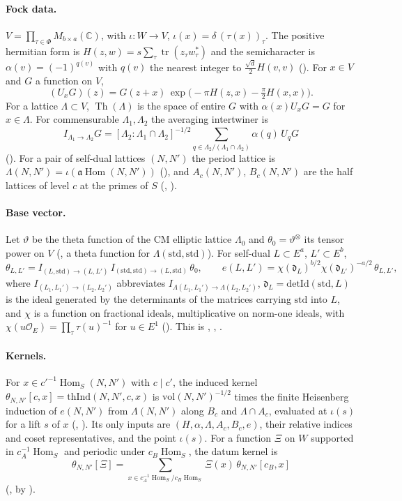 \documentclass[11pt]{article}
\newcommand{\tr}{\operatorname{tr}}
\newcommand{\Hom}{\operatorname{Hom}}
\newcommand{\Th}{\operatorname{Th}}
\newcommand{\OEr}{\mathcal O_E}
\theoremstyle{definition}
\theoremstyle{remark}
\begin{document}
\paragraph{Fock data.} $V=\prod_{\tau\in\Phi}M_{b\times a}(\mathbb C)$, with $\iota\colon W\to V$, $\iota(x)=\delta\,(\tau(x))_\tau$. The positive hermitian form is $H(z,w)=s\sum_\tau\tr(z_\tau w_\tau^*)$ and the semicharacter is $\alpha(v)=(-1)^{q(v)}$ with $q(v)$ the nearest integer to $\tfrac{\sqrt d}{2}H(v,v)$ (). For $x\in V$ and $G$ a function on $V$,
\[
(U_xG)(z)=G(z+x)\,\exp\bigl(-\pi H(z,x)-\tfrac{\pi}{2}H(x,x)\bigr).
\]
For a lattice $\Lambda\subset V$, $\Th(\Lambda)$ is the space of entire $G$ with $\alpha(x)U_xG=G$ for $x\in\Lambda$. For commensurable $\Lambda_1,\Lambda_2$ the averaging intertwiner is
\[
I_{\Lambda_1\to\Lambda_2}G=[\Lambda_2:\Lambda_1\cap\Lambda_2]^{-1/2}\sum_{q\in\Lambda_2/(\Lambda_1\cap\Lambda_2)}\alpha(q)\,U_qG
\]
(). For a pair of self-dual lattices $(N,N')$ the period lattice is $\Lambda(N,N')=\iota(\mathfrak a\Hom(N,N'))$ (), and $A_c(N,N')$, $B_c(N,N')$ are the half lattices of level $c$ at the primes of $S$ (, ).

\paragraph{Base vector.} Let $\vartheta$ be the theta function of the CM elliptic lattice $\Lambda_0$ and $\theta_0=\vartheta^{\otimes}$ its tensor power on $V$ (, a theta function for $\Lambda(\mathrm{std},\mathrm{std})$). For self-dual $L\subset E^a$, $L'\subset E^b$,
\[
\theta_{L,L'}=I_{(L,\mathrm{std})\to(L,L')}\,I_{(\mathrm{std},\mathrm{std})\to(L,\mathrm{std})}\,\theta_0,\qquad
e(L,L')=\chi(\mathfrak d_L)^{b/2}\chi(\mathfrak d_{L'})^{-a/2}\,\theta_{L,L'},
\]
where $I_{(L_1,L_1')\to(L_2,L_2')}$ abbreviates $I_{\Lambda(L_1,L_1')\to\Lambda(L_2,L_2')}$, $\mathfrak d_L=\mathrm{detId}(\mathrm{std},L)$ is the ideal generated by the determinants of the matrices carrying $\mathrm{std}$ into $L$, and $\chi$ is a function on fractional ideals, multiplicative on norm-one ideals, with $\chi(u\OEr)=\prod_\tau\tau(u)^{-1}$ for $u\in E^1$ (). This is , , .

\paragraph{Kernels.} For $x\in c'^{-1}\Hom_S(N,N')$ with $c\mid c'$, the induced kernel $\theta_{N,N'}[c,x]=\mathrm{thInd}(N,N',c,x)$ is $\mathrm{vol}(N,N')^{-1/2}$ times the finite Heisenberg induction of $e(N,N')$ from $\Lambda(N,N')$ along $B_c$ and $\Lambda\cap A_c$, evaluated at $\iota(s)$ for a lift $s$ of $x$ (, ). Its only inputs are $(H,\alpha,\Lambda,A_c,B_c,e)$, their relative indices and coset representatives, and the point $\iota(s)$. For a function $\Xi$ on $W$ supported in $c_A^{-1}\Hom_S$ and periodic under $c_B\Hom_S$, the datum kernel is
\[
\theta_{N,N'}[\Xi]=\sum_{x\in c_A^{-1}\Hom_S/c_B\Hom_S}\Xi(x)\,\theta_{N,N'}[c_B,x]
\]
(, by ).
\end{document}
